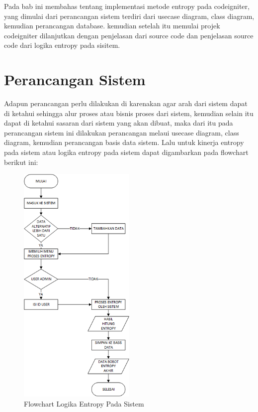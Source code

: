Pada bab ini membahas tentang implementasi metode entropy pada codeigniter, yang dimulai dari perancangan sistem terdiri dari usecase diagram, class diagram, kemudian perancangan database. kemudian setelah itu memulai projek codeigniter dilanjutkan dengan penjelasan dari source code dan penjelasan source code dari logika entropy pada sisitem.
\pagebreak

\section{Perancangan Sistem}
 Adapun perancangan perlu dilakukan di karenakan agar arah dari sistem dapat di ketahui sehingga alur proses atau bisnis proses dari sistem, kemudian selain itu dapat di ketahui sasaran dari sistem yang akan dibuat, maka dari itu pada perancangan sistem ini dilakukan perancangan melaui usecase diagram, class diagram, kemudian perancangan basis data sistem.
Lalu untuk kinerja entropy pada sistem atau logika entropy pada sistem dapat digambarkan pada flowchart berikut ini:\par

\begin{figure}[!htbp]
	\centerline{\includegraphics[width=0.50\textwidth]{figures/uml/A.png}}
	\caption{Flowchart Logika Entropy Pada Sistem}
	\label{Flow}
\end{figure}

